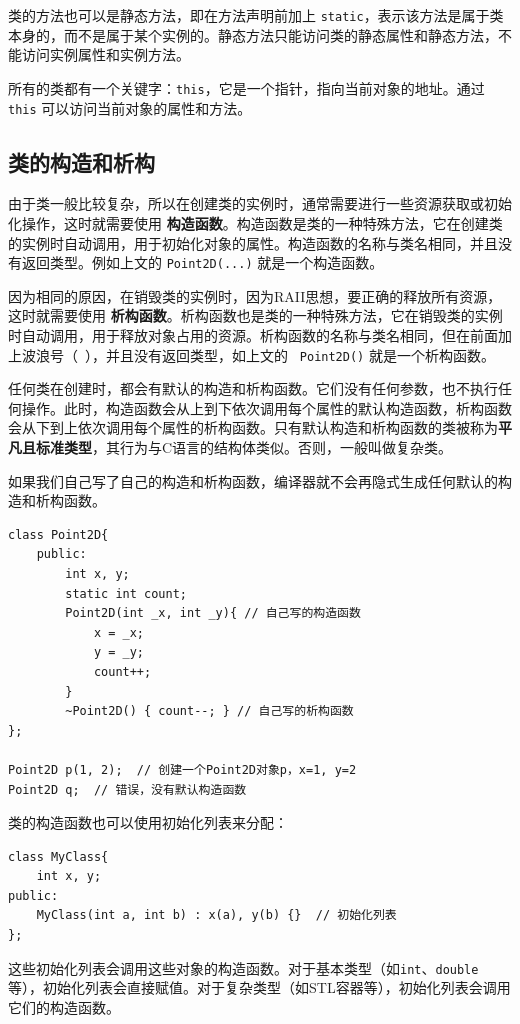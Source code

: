 类的方法也可以是静态方法，即在方法声明前加上 \verb|static|，表示该方法是属于类本身的，而不是属于某个实例的。静态方法只能访问类的静态属性和静态方法，不能访问实例属性和实例方法。

所有的类都有一个关键字：\verb|this|，它是一个指针，指向当前对象的地址。通过 \verb|this| 可以访问当前对象的属性和方法。

\subsection{类的构造和析构}\label{sec:class-constructor-destructor}

由于类一般比较复杂，所以在创建类的实例时，通常需要进行一些资源获取或初始化操作，这时就需要使用 \textbf{构造函数}。构造函数是类的一种特殊方法，它在创建类的实例时自动调用，用于初始化对象的属性。构造函数的名称与类名相同，并且没有返回类型。例如上文的 \texttt{Point2D(...)} 就是一个构造函数。

因为相同的原因，在销毁类的实例时，因为RAII思想，要正确的释放所有资源，这时就需要使用 \textbf{析构函数}。析构函数也是类的一种特殊方法，它在销毁类的实例时自动调用，用于释放对象占用的资源。析构函数的名称与类名相同，但在前面加上波浪号（~），并且没有返回类型，如上文的 \texttt{~Point2D()} 就是一个析构函数。

任何类在创建时，都会有默认的构造和析构函数。它们没有任何参数，也不执行任何操作。此时，构造函数会从上到下依次调用每个属性的默认构造函数，析构函数会从下到上依次调用每个属性的析构函数。只有默认构造和析构函数的类被称为\textbf{平凡且标准类型}，其行为与C语言的结构体类似。否则，一般叫做复杂类。

如果我们自己写了自己的构造和析构函数，编译器就不会再隐式生成任何默认的构造和析构函数。
\begin{verbatim}
class Point2D{
    public:
        int x, y;
        static int count;
        Point2D(int _x, int _y){ // 自己写的构造函数
            x = _x;
            y = _y;
            count++;
        }
        ~Point2D() { count--; } // 自己写的析构函数
};

Point2D p(1, 2);  // 创建一个Point2D对象p，x=1, y=2
Point2D q;  // 错误，没有默认构造函数
\end{verbatim}

类的构造函数也可以使用初始化列表来分配：
\begin{verbatim}
class MyClass{
    int x, y;
public:
    MyClass(int a, int b) : x(a), y(b) {}  // 初始化列表
};
\end{verbatim}
这些初始化列表会调用这些对象的构造函数。对于基本类型（如\verb|int|、\verb|double|等），初始化列表会直接赋值。对于复杂类型（如STL容器等），初始化列表会调用它们的构造函数。

